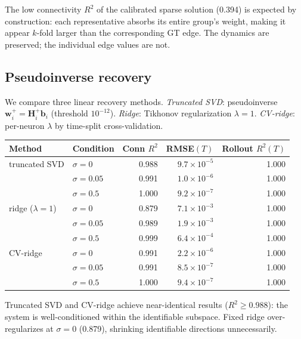 \documentclass[11pt,a4paper]{article}
\begin{document}
The low connectivity $R^2$ of the calibrated sparse solution (0.394) is
expected by construction: each representative absorbs its entire group's
weight, making it appear $k$-fold larger than the corresponding GT edge.
The dynamics are preserved; the individual edge values are not.

\subsection{Pseudoinverse recovery}
\label{subsec:pseudoinverse}

We compare three linear recovery methods. \emph{Truncated SVD}: pseudoinverse
$\mathbf{w}_i^+ = \mathbf{H}_i^+\mathbf{b}_i$ (threshold $10^{-12}$). \emph{Ridge}:
Tikhonov regularization $\lambda=1$. \emph{CV-ridge}: per-neuron $\lambda$ by
time-split cross-validation.

\begin{center}
\begin{tabular}{llrrr}
\toprule
Method & Condition & Conn $R^2$ & RMSE$(T)$ & Rollout $R^2(T)$ \\
\midrule
truncated SVD & $\sigma = 0$    & 0.988 & $9.7\times10^{-5}$ & 1.000 \\
              & $\sigma = 0.05$ & 0.991 & $1.0\times10^{-6}$ & 1.000 \\
              & $\sigma = 0.5$  & 1.000 & $9.2\times10^{-7}$ & 1.000 \\
\midrule
ridge ($\lambda=1$) & $\sigma=0$    & 0.879 & $7.1\times10^{-3}$ & 1.000 \\
                    & $\sigma=0.05$ & 0.989 & $1.9\times10^{-3}$ & 1.000 \\
                    & $\sigma=0.5$  & 0.999 & $6.4\times10^{-4}$ & 1.000 \\
\midrule
CV-ridge & $\sigma=0$    & 0.991 & $2.2\times10^{-6}$ & 1.000 \\
         & $\sigma=0.05$ & 0.991 & $8.5\times10^{-7}$ & 1.000 \\
         & $\sigma=0.5$  & 1.000 & $9.4\times10^{-7}$ & 1.000 \\
\bottomrule
\end{tabular}
\end{center}

Truncated SVD and CV-ridge achieve near-identical results ($R^2 \geq 0.988$):
the system is well-conditioned within the identifiable subspace. Fixed ridge
over-regularizes at $\sigma=0$ (0.879), shrinking identifiable directions
unnecessarily.
\end{document}
